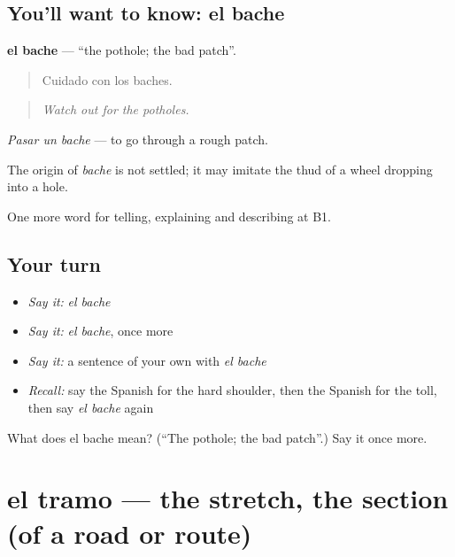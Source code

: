 \subsection*{You'll want to know: el bache}
\textbf{el bache} — \textquotedblleft{}the pothole; the bad patch\textquotedblright{}.

\begin{quote}
Cuidado con los baches.
\end{quote}

\begin{quote}
\emph{Watch out for the potholes.}
\end{quote}

\emph{Pasar un bache} — to go through a rough patch.

\begin{cousinweb}
The origin of \emph{bache} is not settled; it may imitate the thud of a wheel dropping into a hole.
\end{cousinweb}

\begin{grammarlens}[title={What you've built}]
One more word for telling, explaining and describing at B1.
\end{grammarlens}

\subsection*{Your turn}
\begin{itemize}
\raggedright
  \item \emph{Say it:} \emph{el bache}
  \item \emph{Say it:} \emph{el bache}, once more
  \item \emph{Say it:} a sentence of your own with \emph{el bache}
  \item \emph{Recall:} say the Spanish for the hard shoulder, then the Spanish for the toll, then say \emph{el bache} again
\end{itemize}

\begin{tcolorbox}[breakable,colback=teal!4,colframe=teal!35!black,title={Before you move on}]
What does el bache mean? (\textquotedblleft{}The pothole; the bad patch\textquotedblright{}.) Say it once more.
\end{tcolorbox}
\section[el tramo]{el tramo — the stretch, the section (of a road or route)}

